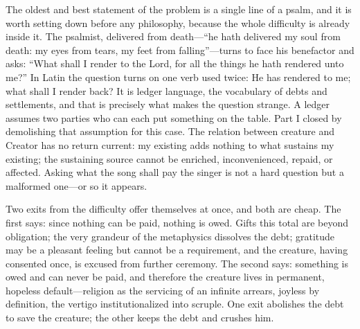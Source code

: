 The oldest and best statement of the problem is a single line of a psalm, and it is worth setting down before any philosophy, because the whole difficulty is already inside it. The psalmist, delivered from death---``he hath delivered my soul from death: my eyes from tears, my feet from falling''---turns to face his benefactor and asks: ``What shall I render to the Lord, for all the things he hath rendered unto me?'' In Latin the question turns on one verb used twice:  He has rendered to me; what shall I render back? It is ledger language, the vocabulary of debts and settlements, and that is precisely what makes the question strange. A ledger assumes two parties who can each put something on the table. Part I closed by demolishing that assumption for this case. The relation between creature and Creator has no return current: my existing adds nothing to what sustains my existing; the sustaining source cannot be enriched, inconvenienced, repaid, or affected. Asking what the song shall pay the singer is not a hard question but a malformed one---or so it appears.

Two exits from the difficulty offer themselves at once, and both are cheap. The first says: since nothing can be paid, nothing is owed. Gifts this total are beyond obligation; the very grandeur of the metaphysics dissolves the debt; gratitude may be a pleasant feeling but cannot be a requirement, and the creature, having consented once, is excused from further ceremony. The second says: something is owed and can never be paid, and therefore the creature lives in permanent, hopeless default---religion as the servicing of an infinite arrears, joyless by definition, the vertigo institutionalized into scruple. One exit abolishes the debt to save the creature; the other keeps the debt and crushes him.

